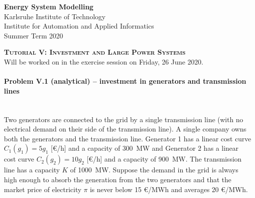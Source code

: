 \documentclass[11pt,a4paper,fleqn]{scrartcl}
\begin{document}
\begin{flushright}
 \textbf{Energy System Modelling }\\
 {\small Karlsruhe Institute of Technology}\\
 {\small Institute for Automation and Applied Informatics}\\
 {\small Summer Term 2020}\\
\end{flushright}

 
 \vspace{-0.5em}
 \hrulefill
 \vspace{0.3em}

\begin{center}
 \textbf{\textsc{\Large Tutorial V: Investment and Large Power Systems}}\\
 \small Will be worked on in the exercise session on Friday, 26 June 2020.\\[1.5em]
\end{center}

\vspace{-0.5em}
\hrulefill
\vspace{0.8em}

\vspace{1em}

\paragraph{Problem V.1 (analytical) -- investment in generators and transmission lines \faGroup}~\\

Two generators are connected to the grid by a single transmission
line (with no electrical demand on their side of the transmission line). A single company owns both the generators and the transmission line. Generator 1 has a linear cost curve $C_1(g_1) = 5 g_1$ [\euro/h] and a capacity of 300~MW and Generator 2 has a linear cost curve $C_2(g_2) = 10 g_2$ [\euro/h] and a capacity of 900~MW. The transmission line has a capacity $K$ of 1000~MW. Suppose the demand in the grid is always high enough to absorb the
generation from the two generators and that the market price of
electricity $\pi$ is never below 15 \euro/MWh and averages 20
\euro/MWh.
\end{document}
